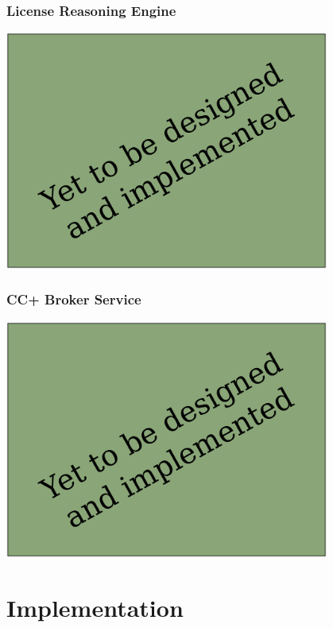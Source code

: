 \documentclass[mathserif,xcolor=dvipsnames,hyperref={bookmarks=true}]{beamer}
\begin{document}
    \begin{frame}[t]
        \frametitle{License Reasoning Engine}
        \begin{center}
            \includegraphics[width=0.8\textwidth]{todo.pdf}
        \end{center}
    \end{frame}

    \begin{frame}[t]
        \frametitle{CC+ Broker Service}
        \begin{center}
            \includegraphics[width=0.8\textwidth]{todo.pdf}
        \end{center}
    \end{frame}

\section{Implementation}
\end{document}
